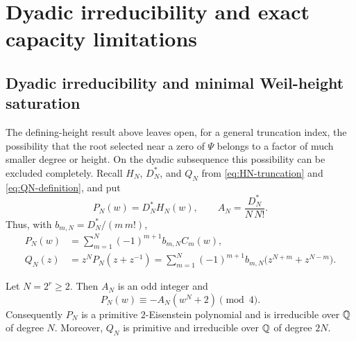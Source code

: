 \section{Dyadic irreducibility and exact capacity limitations}
\label{sec:dyadic-capacity}

\subsection{Dyadic irreducibility and minimal Weil-height saturation}
\label{subsec:dyadic-irreducibility}

The defining-height result above leaves open, for a general truncation
index, the possibility that the root selected near a zero of \(\Psi\)
belongs to a factor of much smaller degree or height.  On the dyadic
subsequence this possibility can be excluded completely.  Recall
\(H_N\), \(D_N^*\), and \(Q_N\) from
\eqref{eq:HN-truncation} and \eqref{eq:QN-definition}, and put
\begin{equation}\label{eq:PN-AN-dyadic}
 P_N(w)=D_N^*H_N(w),
 \qquad
 A_N=\frac{D_N^*}{N\,N!}.
\end{equation}
Thus, with \(b_{m,N}=D_N^*/(m\,m!)\),
\begin{align}
 P_N(w)
 &=\sum_{m=1}^N(-1)^{m+1}b_{m,N}C_m(w),
 \label{eq:PN-chebyshev}\\
 Q_N(z)
 &=z^NP_N(z+z^{-1})
   =\sum_{m=1}^N(-1)^{m+1}b_{m,N}
       \bigl(z^{N+m}+z^{N-m}\bigr).
 \label{eq:QN-dyadic-explicit}
\end{align}

\begin{theorem}
\label{thm:dyadic-reciprocal-irreducibility}
Let \(N=2^r\geq2\).  Then \(A_N\) is an odd integer and
\begin{equation}\label{eq:PN-mod-four}
 \boxed{P_N(w)\equiv-A_N(w^N+2)\pmod 4.}
\end{equation}
Consequently \(P_N\) is a primitive \(2\)-Eisenstein polynomial and is
irreducible over \(\mathbb Q\) of degree \(N\).  Moreover, \(Q_N\) is primitive
and irreducible over \(\mathbb Q\) of degree \(2N\).
\end{theorem}

